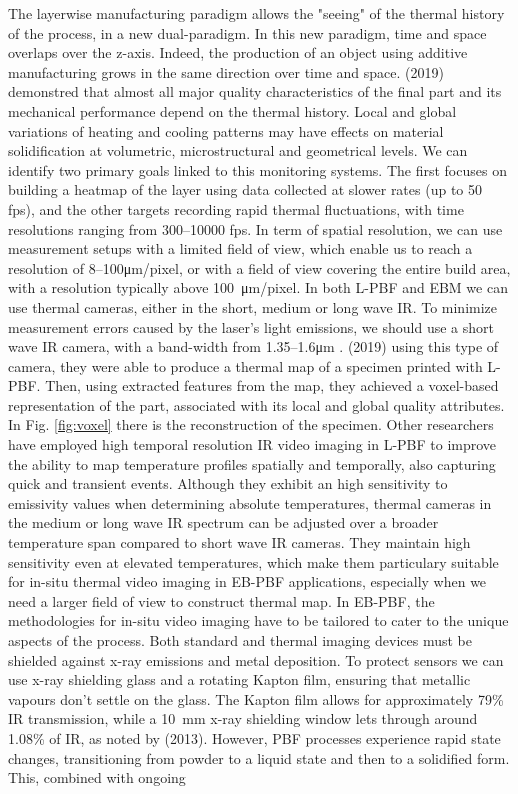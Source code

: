 The layerwise manufacturing paradigm allows the "seeing" of the thermal history of the process, in a new dual-paradigm. In this new paradigm, time and space overlaps over the z-axis. Indeed, the production of an object using additive manufacturing grows in the same direction over time and space. \citeauthor{williams_situ_2019} (2019) demonstred that almost all major quality characteristics of the final part and its mechanical performance depend on the thermal history. Local and global variations of heating and cooling patterns may have effects on material solidification at volumetric, microstructural and geometrical levels. We can identify two primary goals linked to this monitoring systems. The first focuses on building a heatmap of the layer using data collected at slower rates (up to 50 fps), and the other targets recording rapid thermal fluctuations, with time resolutions ranging from \numrange{300}{10000} \unit{fps}. In term of spatial resolution, we can use measurement setups with a limited field of view, which enable us to reach a resolution of \numrange[range-phrase=--]{8}{100}\unit{\micro\metre / pixel}, or with a field of view covering the entire build area, with a resolution typically above \SI{100}{\micro\metre / pixel}. In both L-PBF and EBM we can use thermal cameras, either in the short, medium or long wave IR. To minimize measurement errors caused by the laser's light emissions, we should use a short wave IR camera, with a band-width from \numrange{1.35}{1.6}\unit{\micro\metre} \cite{heigel_situ_2020}. \citeauthor{lough_-situ_2019} (2019) using this type of camera, they were able to produce a thermal map of a specimen printed with L-PBF. Then, using extracted features from the map, they achieved a voxel-based representation of the part, associated with its local and global quality attributes. In Fig. \ref{fig:voxel} there is the reconstruction of the specimen. Other researchers have employed high temporal resolution IR video imaging in L-PBF to improve the ability to map temperature profiles spatially and temporally, also capturing quick and transient events. Although they exhibit an high sensitivity to emissivity values when determining absolute temperatures, thermal cameras in the medium or long wave IR spectrum can be adjusted over a broader temperature span compared to short wave IR cameras. They maintain high sensitivity even at elevated temperatures, which make them particulary suitable for in-situ thermal video imaging in EB-PBF applications, especially when we need a larger field of view to construct thermal map. In EB-PBF, the methodologies for in-situ video imaging have to be tailored to cater to the unique aspects of the process. Both standard and thermal imaging devices must be shielded against x-ray emissions and metal deposition. To protect sensors we can use x-ray shielding glass and a rotating Kapton film, ensuring that metallic vapours don't settle on the glass. The Kapton film allows for approximately 79\% IR transmission, while a \SI{10}{\milli\metre} x-ray shielding window lets through around 1.08\% of IR, as noted by \citeauthor{ralph_b_dinwiddie_thermographic_2013} (2013). However, PBF processes experience rapid state changes, transitioning from powder to a liquid state and then to a solidified form. This, combined with ongoing 